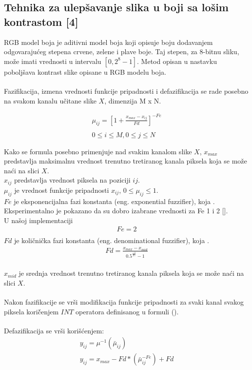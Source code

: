 \documentclass[12pt,a4paper]{article}
\theoremstyle{definition}
\theoremstyle{remark}
\theoremstyle{plain}
\begin{document}
\newpage
\subsection{Tehnika za ulep\v savanje slika u boji sa lo\v sim kontrastom [4]}

RGB model boja je aditivni model boja koji opisuje boju dodavanjem odgovaraju\' ceg stepena crvene, zelene i plave boje. Taj stepen, za 8-bitnu sliku, mo\v ze imati vrednosti u intervalu $[0, 2^8 - 1]$. 
Metod opisan u nastavku pobolj\v sava kontrast slike opisane u RGB modelu boja. \\ \\
Fazifikacija, izmena vrednosti funkcije pripadnosti i defazifikacija se rade posebno na svakom kanalu u\v citane slike $X$, dimenzija M x N.

\begin{align*}
  \mu_{ij} = [1 + \frac{x_{max} - x_{ij}}{Fd}]^{-Fe} \\ \\
  0\leq i \leq M, 0\leq j \leq N
\end{align*}

Kako se formula posebno primenjuje nad svakim kanalom slike $X$, $x_{max}$ predstavlja maksimalnu vrednost trenutno tretiranog kanala piksela koja se mo\v ze na\' ci na slici $X$.\\
$x_{ij}$ predstavlja vrednost piksela na poziciji $ij$. \\ 
$\mu_{ij}$ je vrednost funkcije pripadnosti $x_{ij}$, $0\leq \mu_{ij} \leq 1$.\\
$Fe$ je eksponencijalna fazi konstanta (eng. exponential fuzzifier), koja . \\
Eksperimentalno je pokazano da su dobro izabrane vrednosti za Fe 1 i 2 []. \\
U na\v soj implementaciji 
\begin{align*}
  Fe = 2\\
\end{align*}
$Fd$ je koli\v cni\v cka fazi konstanta (eng. denominational fuzzifier), koja . \\
\begin{align*}
  Fd = \frac{x_{max} - x_{mid}}{0.5^{\frac{-1}{Fe}} - 1}
\end{align*}
\\
$x_{mid}$ je srednja vrednost trenutno tretiranog kanala piksela koja se mo\v ze na\' ci na slici $X$. \\ \\
Nakon fazifikacije se vr\v si modifikacija funkcije pripadnosti za svaki kanal svakog piksela kori\v \' cenjem $INT$ operatora definisanog u formuli ().\\
\\
Defazifikacija se vr\v si kori\v s\' cenjem:\\
\begin{align*}
  y_{ij} = \mu^{-1}(\bar\mu_{ij})\\
  y_{ij} = x_{max} - Fd * (\bar\mu_{ij}^{-Fe}) + Fd\\
\end{align*}
\end{document}
